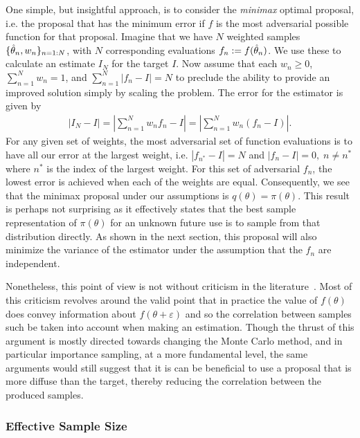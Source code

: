 One simple, but insightful approach, is to consider the 
\emph{minimax} optimal proposal, i.e. the proposal that has the minimum error if $f$ is the
most adversarial possible function for that proposal.
Imagine that we have $N$ weighted samples
$\{\hat{\theta}_n,w_n\}_{n=1:N}$, with $N$ corresponding evaluations $f_n := f(\hat{\theta}_n)$.
We use these to calculate an estimate $I_N$ for the target $I$.
Now assume that each $w_n\ge0$, $\sum_{n=1}^{N}w_n = 1$, and $\sum_{n=1}^{N} |f_n-I| = N$ to
preclude the ability to provide an improved solution simply by scaling the problem.
The error for the estimator is given by
\begin{align}
\left|I_N-I\right| = \left|\sum_{n=1}^{N} w_n f_n - I\right| = \left|\sum_{n=1}^{N} w_n (f_n - I)\right|.
\end{align}
For any given set of weights, the most adversarial set of function evaluations is
to have all our error at the largest weight, i.e. $|f_{n^*}-I| = N$ and $|f_{n}-I| = 0, \; n\neq n^*$
where $n^*$ is the index of the largest weight.  For this set of adversarial $f_n$, the
lowest error is achieved when each of the weights are equal.  Consequently,
we see that the minimax proposal under our assumptions is $q(\theta)=\pi(\theta)$.
This result is perhaps not surprising as it effectively states that the best sample representation 
of $\pi(\theta)$ for an unknown future use is to sample from that distribution directly.
As shown in the next section, this proposal will also minimize the variance of the estimator
under the assumption that the $f_n$ are independent.

Nonetheless, this point of view is not without criticism in the 
literature~\citep{o1987monte,ghahramani2003bayesian,briol2015probabilistic}.  Most of 
this criticism revolves around the valid point that in practice the value of $f(\theta)$ 
does convey information about $f(\theta+\varepsilon)$ and so the correlation between 
samples such be taken into account when making an estimation.  Though the thrust of
this argument is mostly directed towards changing the Monte Carlo method, and in particular
importance sampling, at a more fundamental level, the same arguments would still suggest
that it is can be beneficial to use a proposal that is more diffuse than the target, thereby
reducing the correlation between the produced samples.

\subsubsection{Effective Sample Size}
\label{sec:inf:foundation:ess}


